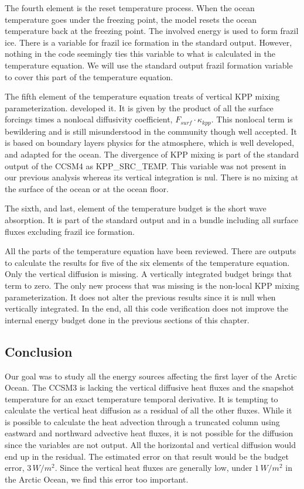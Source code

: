 The fourth element is the reset temperature process. When the ocean temperature goes under the freezing point, the model resets the ocean temperature back at the freezing point. The involved energy is used to form frazil ice. There is a variable for frazil ice formation in the standard output. However, nothing in the code seemingly ties this variable to what is calculated in the temperature equation. We will use the standard output frazil formation variable to cover this part of the temperature equation. 

The fifth element of the temperature equation treats of vertical KPP mixing parameterization. \cite{ROG:ROG1432} developed it. It is given by the product of all the surface forcings times a nonlocal diffusivity coefficient, $F_{surf} \cdot \kappa_{kpp}$. This nonlocal term is bewildering and is still misunderstood in the community though well accepted. It is based on boundary layers physics for the atmosphere, which is well developed, and adapted for the ocean. The divergence of KPP mixing is part of the standard output of the CCSM4 as KPP\_SRC\_TEMP. This variable was not present in our previous analysis whereas its vertical integration is nul. There is no mixing at the surface of the ocean or at the ocean floor. 

The sixth, and last, element of the temperature budget is the short wave absorption. It is part of the standard output and in a bundle including all surface fluxes excluding frazil ice formation. 

All the parts of the temperature equation have been reviewed. There are outputs to calculate the results for five of the six elements of the temperature equation. Only the vertical diffusion is missing. A vertically integrated budget brings that term to zero. The only new process that was missing is the non-local KPP mixing parameterization. It does not alter the previous results since it is null when vertically integrated. In the end, all this code verification does not improve the internal energy budget done in the previous sections of this chapter.

\subsection{Conclusion}\label{concEB}

Our goal was to study all the energy sources affecting the first layer of the Arctic Ocean. The CCSM3 is lacking the vertical diffusive heat fluxes and the snapshot temperature for an exact temperature temporal derivative. It is tempting to calculate the vertical heat diffusion as a residual of all the other fluxes. While it is possible to calculate the heat advection through a truncated column using  eastward and northward advective heat fluxes, it is not possible for the diffusion since the variables are not output. All the horizontal and vertical diffusion would end up in the residual. The estimated error on that result would be the budget error, $3\,W/m^2$. Since the vertical heat fluxes are generally low, under $1\,W/m^2$ in the Arctic Ocean, we find this error too important. 

